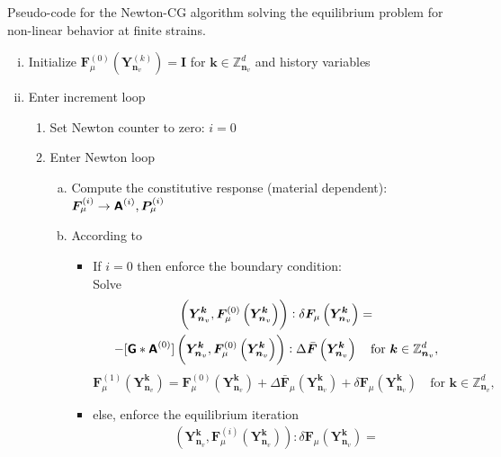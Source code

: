 \begin{framedbox}[htb]
\caption{Pseudo-code for the Newton-CG algorithm solving the equilibrium problem for non-linear behavior at finite strains.}
\label{box:alg_newton_cg_finite_strains}
\begin{center}
\begin{minipage}{0.9\textwidth}
\begin{enumerate}[(i)]
\item Initialize \(\bm F_\mu^{(0)}\left(\bm Y^{(k)}_{\bm n_v}\right) = \bm I\) for \(\bm k \in \mathbb Z^d_{\bm n_v}\) and history variables
\item Enter increment loop
\begin{enumerate}[(1)]
  \item Set Newton counter to zero: \(i=0\)
  \item Enter Newton loop
  \begin{enumerate}[(a)]
    \item Compute the constitutive response (material dependent): \(\bm F_\mu^{(i)} \to \boldsymbol{\mathsf{A}}^{(i)}, \bm P_\mu^{(i)}\)
    \item According to
    \begin{itemize}
      \item If \(i=0\) then enforce the boundary condition:\\
      Solve
      \begin{multline*}
      [\boldsf{G}* \boldsf{A}^{(0)}]\left(\bm Y_{\bm n_v}^{\bm  k}, \bm F_\mu^{(0)}\left(\bm Y_{\bm n_v}^{\bm  k}\right)\right): \delta \bm{F}_\mu\left(\bm Y_{\bm n_v}^{\bm  k}\right)=\\-[\boldsf{G}* \boldsf{A}^{(0)}]\left(\bm Y_{\bm n_v}^{\bm  k}, \bm F_\mu^{(0)}\left(\bm Y_{\bm n_v}^{\bm  k}\right)\right): \Delta \bar{\bm{F}}\left(\bm Y_{\bm n_v}^{\bm  k}\right)\quad \text{for \(\bm k \in \mathbb Z^d_{\bm n_v}\)},
      \end{multline*}
      \begin{equation*}
      {\bm{F}}_\mu^{(1)}\left(\bm Y_{\bm n_v}^{\bm  k}\right)={\bm{F}}_\mu^{(0)}\left(\bm Y_{\bm n_v}^{\bm  k}\right)+\Delta \bar{\bm{F}}_\mu\left(\bm Y_{\bm n_v}^{\bm  k}\right)+\delta {\bm{F}}_\mu\left(\bm Y_{\bm n_v}^{\bm  k}\right)\quad \text{for \(\bm k \in \mathbb Z^d_{\bm n_v}\)},
      \end{equation*}
      \item else, enforce the equilibrium iteration
      \begin{multline*}
      [\boldsf{G}* \boldsf A^{(i)}] \left(\bm Y_{\bm n_v}^{\bm  k}, \bm F_\mu^{(i)}\left(\bm Y_{\bm n_v}^{\bm  k}\right)\right):\delta {\bm{F}_\mu}\left(\bm Y_{\bm n_v}^{\bm  k}\right)= \\

\end{multline*}
\end{itemize}
\end{enumerate}
\end{enumerate}
\end{enumerate}
\end{minipage}
\end{center}
\end{framedbox}
